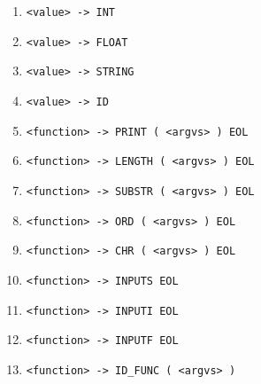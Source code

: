 \documentclass [11pt, a4paper]{article}
\begin{document}
\begin{table}[H]
\begin{enumerate}[noitemsep]
        \item \verb|<value> -> INT|
        \item \verb|<value> -> FLOAT|
        \item \verb|<value> -> STRING|
        \item \verb|<value> -> ID|
       
        \item \verb|<function> -> PRINT ( <argvs> ) EOL|
        \item \verb|<function> -> LENGTH ( <argvs> ) EOL|
        \item \verb|<function> -> SUBSTR ( <argvs> ) EOL|
        \item \verb|<function> -> ORD ( <argvs> ) EOL|
        \item \verb|<function> -> CHR ( <argvs> ) EOL|
        \item \verb|<function> -> INPUTS EOL|
        \item \verb|<function> -> INPUTI EOL|
        \item \verb|<function> -> INPUTF EOL|
        \item \verb|<function> -> ID_FUNC ( <argvs> )|
	\end{enumerate}
\end{table}
\end{document}
